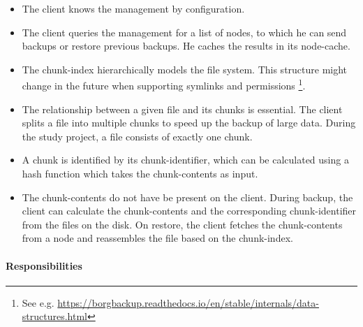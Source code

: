 \begin{itemize}
    \item The \gls{client} knows the \gls{management} by configuration.
    \item The \gls{client} queries the \gls{management} for a list of \glspl{node}, to which he can send backups or restore previous backups. He caches the results in its \gls{node-cache}.
    \item The \gls{chunk-index} hierarchically models the file system. This structure might change in the future when supporting symlinks and permissions \footnote{See e.g. \url{https://borgbackup.readthedocs.io/en/stable/internals/data-structures.html}}.
    \item The relationship between a given \gls{file} and its \glspl{chunk} is essential. The \gls{client} splits a \gls{file} into multiple \glspl{chunk} to speed up the backup of large data. During the study project, a \gls{file} consists of exactly one \gls{chunk}.
    \item A \gls{chunk} is identified by its \gls{chunk-identifier}, which can be calculated using a hash function which takes the \glspl{chunk-content}  as input.
    \item The \glspl{chunk-content} do not have be present on the \gls{client}. During backup, the \gls{client} can calculate the \glspl{chunk-content} and the corresponding \gls{chunk-identifier} from the \glspl{file} on the disk. On restore, the \gls{client} fetches the \glspl{chunk-content} from a \gls{node} and reassembles the \gls{file} based on the \gls{chunk-index}.
\end{itemize}


\paragraph{Responsibilities}


